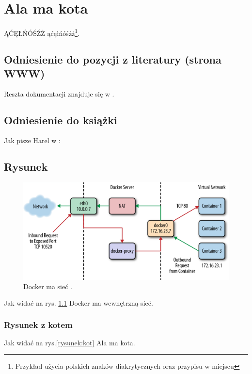 \chapter{Ala ma kota}

ĄĆĘŁŃÓŚŹŻ ąćęłńóśźż\footnote{Przykład użycia polskich znaków diakrytycznych oraz przypisu w miejscu}. \lipsum[1]

\section{Odniesienie do pozycji z literatury (strona WWW)}

Reszta dokumentacji znajduje się w \cite{docker_compose_reference}. \lipsum[3]

\section{Odniesienie do książki}

Jak pisze Harel w \cite{harel_rzecz_2008}: \lipsum[7]

\section{Rysunek}

\begin{figure}
\centering\includegraphics[width=.6\textwidth]{img/swarm-network}
\caption{Docker ma sieć \cite{docker_compose_reference}.}  \label{rys:network}%
\end{figure}

Jak widać na rys. \ref{rys:network} Docker ma wewnętrzną sieć. \lipsum[1]


\subsection{Rysunek z kotem}

Jak widać na rys.\ref{rysunek:kot} Ala ma kota. \lipsum[9-10] 

